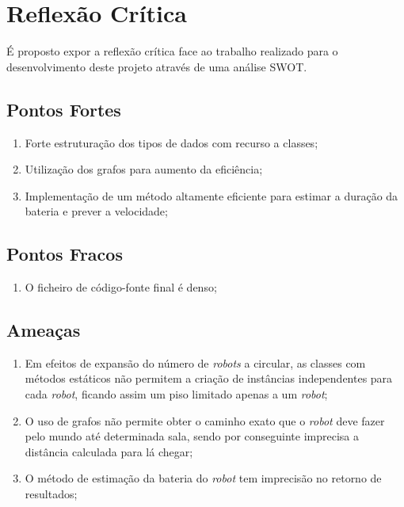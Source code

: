 \section{Reflexão Crítica}
\label{sec::reflexao:critica}

É proposto expor a reflexão crítica face ao trabalho realizado para o desenvolvimento deste projeto através de uma análise \ac{SWOT}.


\subsection{Pontos Fortes}
\label{ssec::reflexao:critica:fortes}

\begin{enumerate}
	\item Forte estruturação dos tipos de dados com recurso a classes;
	
	\item Utilização dos grafos para aumento da eficiência;
	
	\item Implementação de um método altamente eficiente para estimar a duração da bateria e prever a velocidade;
\end{enumerate}


\subsection{Pontos Fracos}
\label{ssec::reflexao:critica:fracos}

\begin{enumerate}
	\item O ficheiro de código-fonte final é denso;
\end{enumerate}


\subsection{Ameaças}
\label{ssec::reflexao:critica:ameacas}

\begin{enumerate}
	\item Em efeitos de expansão do número de \emph{robots} a circular, as classes com métodos estáticos não permitem a criação de instâncias independentes para cada \emph{robot}, ficando assim um piso limitado apenas a um \emph{robot};
	
	\item O uso de grafos não permite obter o caminho exato que o \emph{robot} deve fazer pelo mundo até determinada sala, sendo por conseguinte imprecisa a distância calculada para lá chegar;
	
	\item O método de estimação da bateria do \emph{robot} tem imprecisão no retorno de resultados;
\end{enumerate}


